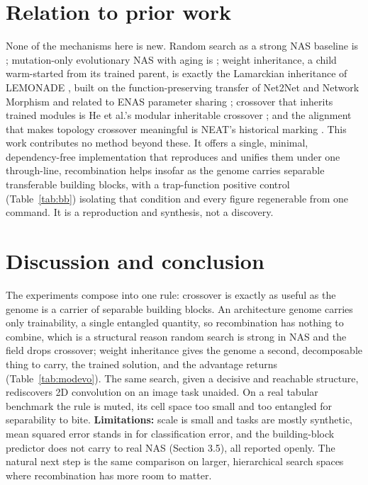 \documentclass[11pt]{article}
\begin{document}
\section{Relation to prior work}

None of the mechanisms here is new. Random search as a strong NAS baseline is
\cite{bergstra2012,li2019}; mutation-only evolutionary NAS with aging is \cite{real2019};
weight inheritance, a child warm-started from its trained parent, is exactly the
Lamarckian inheritance of LEMONADE \cite{lemonade2019}, built on the function-preserving
transfer of Net2Net \cite{net2net2016} and Network Morphism \cite{netmorph2016} and
related to ENAS parameter sharing \cite{enas2018}; crossover that inherits trained
modules is He et al.'s modular inheritable crossover \cite{modxover2021}; and the
alignment that makes topology crossover meaningful is NEAT's historical marking
\cite{neat2002}. This work contributes no method beyond these. It offers a single,
minimal, dependency-free implementation that reproduces and unifies them under one
through-line, recombination helps insofar as the genome carries separable transferable
building blocks, with a trap-function positive control (Table~\ref{tab:bb}) isolating
that condition and every figure regenerable from one command. It is a reproduction and
synthesis, not a discovery.

\section{Discussion and conclusion}

The experiments compose into one rule: crossover is exactly as useful as the genome is a
carrier of separable building blocks. An architecture genome carries only trainability, a
single entangled quantity, so recombination has nothing to combine, which is a
structural reason random search is strong in NAS and the field \cite{real2019} drops
crossover; weight inheritance gives the genome a second, decomposable thing to carry, the
trained solution, and the advantage returns (Table~\ref{tab:modevo}). The same search,
given a decisive and reachable structure, rediscovers 2D convolution on an image task
unaided. On a real tabular benchmark the rule is muted, its cell space too small and too
entangled for separability to bite. \textbf{Limitations:} scale is small and tasks are
mostly synthetic, mean squared error stands in for classification error, and the
building-block predictor does not carry to real NAS (Section 3.5), all reported openly.
The natural next step is the same comparison on larger, hierarchical search spaces where
recombination has more room to matter.
\end{document}
